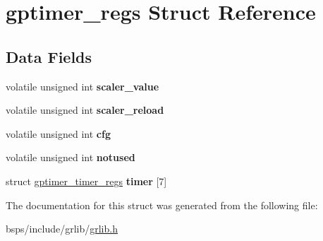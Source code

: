\hypertarget{structgptimer__regs}{}\section{gptimer\+\_\+regs Struct Reference}
\label{structgptimer__regs}
\subsection*{Data Fields}
\begin{DoxyCompactItemize}
\item 
\mbox{\label{structgptimer__regs_a692f816b7b957204a82dc45df7f9e644}} 
volatile unsigned int {\bfseries scaler\+\_\+value}
\item 
\mbox{\label{structgptimer__regs_a661d0060155a0af02d12d3447390e269}} 
volatile unsigned int {\bfseries scaler\+\_\+reload}
\item 
\mbox{\label{structgptimer__regs_a7db1332bcc5704b65b01bdc712b71a35}} 
volatile unsigned int {\bfseries cfg}
\item 
\mbox{\label{structgptimer__regs_abbd7a0a4ad5f43161729db91f1ef9cff}} 
volatile unsigned int {\bfseries notused}
\item 
\mbox{\label{structgptimer__regs_a4b14a6733cf46dc607fbe2c481420db2}} 
struct \mbox{\hyperlink{structgptimer__timer__regs}{gptimer\+\_\+timer\+\_\+regs}} {\bfseries timer} \mbox{[}7\mbox{]}
\end{DoxyCompactItemize}


The documentation for this struct was generated from the following file\+:\begin{DoxyCompactItemize}
\item 
bsps/include/grlib/\mbox{\hyperlink{grlib_8h}{grlib.\+h}}\end{DoxyCompactItemize}
